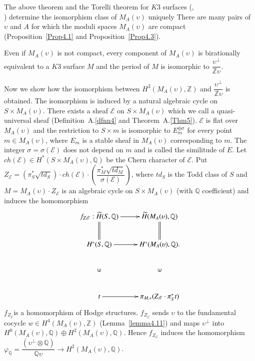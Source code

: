 The above theorem and the Torelli theorem for $K3$ surfaces
(\cite{key7},\\\cite{key20}) determine the isomorphism class of
$M_A(\upsilon)$ uniquely There are many pairs of $\upsilon$ and $A$
for which the moduli spaces $M_A(\upsilon)$ are compact
(Proposition~\ref{Prop4.1} and Proposition~\ref{Prop4.3}).

\begin{Remark}
Even if $M_A(\upsilon)$ is not compact, every component of
$M_A(\upsilon)$ is birationally equivalent to a $K3$ surface $M$ and
the period of $M$ is isomorphic to
$\dfrac{\upsilon^{\perp}}{\mathbb{Z}\upsilon}$.

Now we show how the isomorphism between
$H^{2}(M_A(\upsilon),\mathbb{Z})$ and
$\dfrac{\upsilon^{\perp}}{\mathbb{Z}\upsilon}$ is obtained. The
isomorphism is induced by a natural algebraic cycle on $S\times
M_A(\upsilon)$. There exists a sheaf $\mathscr{E}$ on $S\times
M_A(\upsilon)$ which we call a quasi-universal sheaf (Definition~A.\ref{dfnn4}
and Theorem~A.\ref{Thm5}). $\mathscr{E}$ is flat over $M_A(\upsilon)$ and the
restriction to $S\times m$ is isomorphic to $E^{\oplus\sigma}_m$ for
every point $m\in M_A(\upsilon)$, where $E_m$ is a stable sheaf in
$M_A(\upsilon)$ corresponding to $m$. The integer
$\sigma=\sigma(\mathscr{E})$ does not depend on $m$ and is called the
similitude of $E$. Let $ch(\mathscr{E})\in H^{\ast}(S\times
M_A(\upsilon),\mathbb{Q})$ be the Chern character of
$\mathscr{E}$. Put
$Z_{\mathscr{E}}=\left(\pi^{\ast}_S\sqrt{td_S}\right)\cdot
ch(\mathscr{E})\cdot\left(\dfrac{\pi^{\ast}_{M}\sqrt{td_M}}{\sigma(\mathscr{E})}\right)$,
where $td_S$ is the Todd class of $S$ and $M=M_A(\upsilon)\cdot
Z_{\mathscr{E}}$ is an algebraic cycle on $S\times M_A(\upsilon)$
(with $\mathbb{Q}$ coefficient) and induces the homomorphism 
$$
\xymatrix{f_{Z\mathscr{E}}:\widetilde{H}(S,\mathbb{Q})\ar@{=}[d]\ar[r]& \widetilde{H}(M_A(\upsilon),\mathbb{Q}\ar@{=}[d])\\
H^{\ast}(S,\mathbb{Q})\ar[r]&H^{\ast}(M_A(\upsilon),\mathbb{Q}).\\
\mbox{\rotatebox{90}{$\in$}} & \mbox{\rotatebox{90}{$\in$}}\\
t\ar[r]&\pi_{M,\ast}(Z_{\mathscr{E}}\cdot \pi^{\ast}_St)}
$$
$f_{Z_{\mathscr{E}}}$\pageoriginale is a homomorphism of Hodge
structures. $f_{Z_{\mathscr{E}}}$ sends $\upsilon$ to the fundamental
cocycle $w\in H^{4}(M_A(\upsilon),\mathbb{Z})$
(Lemma~\ref{lemma4.11}) and maps $\upsilon^{\perp}$ into
$H^{0}(M_A(\upsilon),\mathbb{Q})\oplus H^{2}(M_A(\upsilon),
\mathbb{Q})$. Hence $f_{Z_{\mathscr{E}}}$ induces the homomorphism
$\varphi_{\mathbb{Q}}=\dfrac{\left(\upsilon^{\perp}\otimes \mathbb{Q}\right)}{\mathbb{Q}\upsilon}
\to H^{2}\left(M_A(\upsilon),\mathbb{Q}\right)$. 
\end{Remark}

